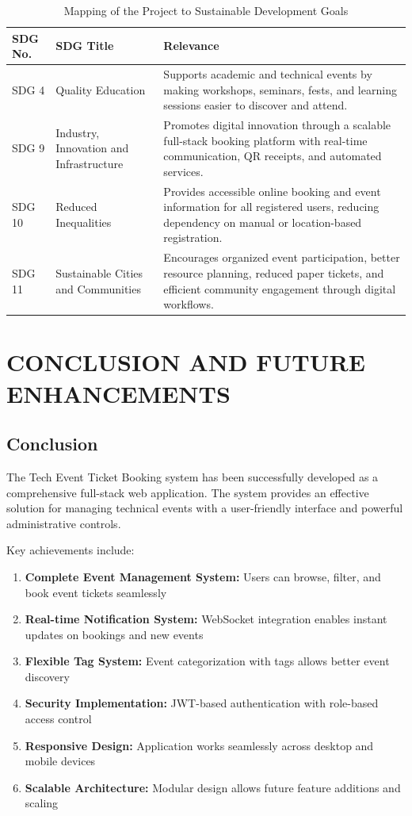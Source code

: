 \documentclass[12pt]{report}
\begin{document}
\begin{table}[H]
\centering
\caption{Mapping of the Project to Sustainable Development Goals}
\renewcommand{\arraystretch}{1.25}
\begin{tabular}{|p{2cm}|p{4.2cm}|p{8.8cm}|}
\hline
\rowcolor{gray!30}
\textbf{SDG No.} & \textbf{SDG Title} & \textbf{Relevance}\\
\hline
SDG 4 & Quality Education & Supports academic and technical events by making workshops, seminars, fests, and learning sessions easier to discover and attend.\\
\hline
SDG 9 & Industry, Innovation and Infrastructure & Promotes digital innovation through a scalable full-stack booking platform with real-time communication, QR receipts, and automated services.\\
\hline
SDG 10 & Reduced Inequalities & Provides accessible online booking and event information for all registered users, reducing dependency on manual or location-based registration.\\
\hline
SDG 11 & Sustainable Cities and Communities & Encourages organized event participation, better resource planning, reduced paper tickets, and efficient community engagement through digital workflows.\\
\hline
\end{tabular}
\end{table}

\chapter{CONCLUSION AND FUTURE ENHANCEMENTS} 
\linespread{1.5} 
\section{Conclusion} 

The Tech Event Ticket Booking system has been successfully developed as a comprehensive full-stack web application. The system provides an effective solution for managing technical events with a user-friendly interface and powerful administrative controls.

Key achievements include:

\begin{enumerate}
\item \textbf{Complete Event Management System:} Users can browse, filter, and book event tickets seamlessly
\item \textbf{Real-time Notification System:} WebSocket integration enables instant updates on bookings and new events
\item \textbf{Flexible Tag System:} Event categorization with tags allows better event discovery
\item \textbf{Security Implementation:} JWT-based authentication with role-based access control
\item \textbf{Responsive Design:} Application works seamlessly across desktop and mobile devices
\item \textbf{Scalable Architecture:} Modular design allows future feature additions and scaling
\end{enumerate}
\end{document}
